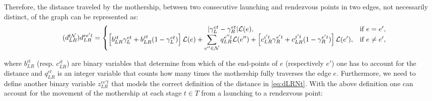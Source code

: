 

\noindent
Therefore, the distance traveled by the mothership, between two consecutive launching and rendezvous points in two edges, not necessarily distinct,  of the graph can be represented as:
\begin{equation}\tag{$d^{t\mathcal N}_{LR}$}\label{eq:dLRNt}
d_{LR}^{ee't} = \left\{\begin{matrix}
|\gamma_{L}^{et} - \gamma_{R}^{et}|\mathcal L(e), & \text{if } e = e',\\
\left[b_{LR}^{it}\gamma_{L}^{et} + b_{LR}^{jt}(1 - \gamma_{L}^{et})\right]\mathcal L(e) + \displaystyle \sum_{e''\in \mathcal N}q_{LR}^{e''t}\mathcal L(e'') + \left[c_{LR}^{i't}\gamma_{R}^{e't} + c_{LR}^{j't}(1 - \gamma_{R}^{e't})\right]\mathcal{L}(e'), & \text{if } e \neq e',
\end{matrix}\right.
\end{equation}

\noindent
where $b_{LR}^{it}$ (resp. $c_{LR}^{it}$) are binary variables that determine from which of the end-points of $e$ (respectively $e'$) one has to account for the distance and $q_{LR}^{et}$ is an integer variable that counts how many times the mothership fully traverses the edge $e$. Furthermore, we need to define another binary variable $z_{LR}^{ee't}$ that models the correct definition of the distance in \eqref{eq:dLRNt}. With the above definition one can account for  the movement of the mothership at each stage $t\in T$ from a launching to a rendezvous  point:

